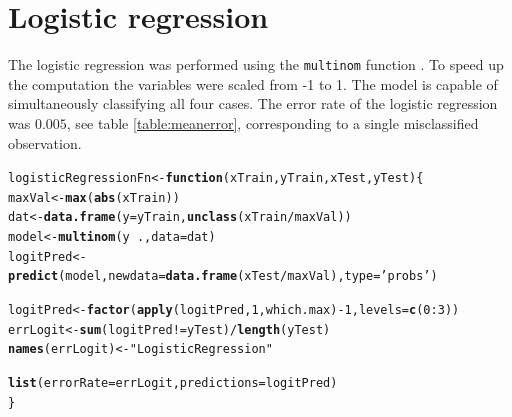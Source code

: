 \documentclass[a4paper,draft=false]{scrreprt}\usepackage[]{graphicx}\usepackage[]{color}
\makeatletter
\newcommand{\hlnum}[1]{\textcolor[rgb]{0.686,0.059,0.569}{#1}}%
\newcommand{\hlstr}[1]{\textcolor[rgb]{0.192,0.494,0.8}{#1}}%
\newcommand{\hlopt}[1]{\textcolor[rgb]{0,0,0}{#1}}%
\newcommand{\hlstd}[1]{\textcolor[rgb]{0.345,0.345,0.345}{#1}}%
\newcommand{\hlkwa}[1]{\textcolor[rgb]{0.161,0.373,0.58}{\textbf{#1}}}%
\newcommand{\hlkwb}[1]{\textcolor[rgb]{0.69,0.353,0.396}{#1}}%
\newcommand{\hlkwc}[1]{\textcolor[rgb]{0.333,0.667,0.333}{#1}}%
\newcommand{\hlkwd}[1]{\textcolor[rgb]{0.737,0.353,0.396}{\textbf{#1}}}%
\newenvironment{kframe}{%
 \def\at@end@of@kframe{}%
 \ifinner\ifhmode%
  \def\at@end@of@kframe{\end{minipage}}%
  \begin{minipage}{\columnwidth}%
 \fi\fi%
 \def\FrameCommand##1{\hskip\@totalleftmargin \hskip-\fboxsep
 \colorbox{shadecolor}{##1}\hskip-\fboxsep
     \hskip-\linewidth \hskip-\@totalleftmargin \hskip\columnwidth}%
 \MakeFramed {\advance\hsize-\width
   \@totalleftmargin\z@ \linewidth\hsize
   \@setminipage}}%
 {\par\unskip\endMakeFramed%
 \at@end@of@kframe}
\newenvironment{knitrout}{}{} %
\makeatother
\begin{document}
\section{Logistic regression} %
The logistic regression was performed using the \verb+multinom+ function \cite{nnet}. To speed up the computation the variables were scaled from -1 to 1. The model is capable of simultaneously classifying all four cases. The error rate of the logistic regression was $0.005$, see table \ref{table:meanerror}, corresponding to a single misclassified observation.
\begin{knitrout}
\color{fgcolor}\begin{kframe}
\begin{alltt}
\hlstd{logisticRegressionFn} \hlkwb{<-} \hlkwa{function}\hlstd{(}\hlkwc{xTrain}\hlstd{,} \hlkwc{yTrain}\hlstd{,} \hlkwc{xTest}\hlstd{,} \hlkwc{yTest}\hlstd{)\{}
    \hlstd{maxVal} \hlkwb{<-} \hlkwd{max}\hlstd{(}\hlkwd{abs}\hlstd{(xTrain))}
    \hlstd{dat} \hlkwb{<-} \hlkwd{data.frame}\hlstd{(}\hlkwc{y} \hlstd{= yTrain,} \hlkwd{unclass}\hlstd{(xTrain}\hlopt{/}\hlstd{maxVal))}
    \hlstd{model} \hlkwb{<-} \hlkwd{multinom}\hlstd{(y} \hlopt{~} \hlstd{.,} \hlkwc{data} \hlstd{= dat)}
    \hlstd{logitPred} \hlkwb{<-} \hlkwd{predict}\hlstd{(model,} \hlkwc{newdata}\hlstd{=} \hlkwd{data.frame}\hlstd{(xTest}\hlopt{/}\hlstd{maxVal),} \hlkwc{type}\hlstd{=}\hlstr{'probs'}\hlstd{)}

    \hlstd{logitPred} \hlkwb{<-} \hlkwd{factor}\hlstd{(}\hlkwd{apply}\hlstd{(logitPred,} \hlnum{1}\hlstd{, which.max)} \hlopt{-} \hlnum{1}\hlstd{,} \hlkwc{levels} \hlstd{=} \hlkwd{c}\hlstd{(}\hlnum{0}\hlopt{:}\hlnum{3}\hlstd{))}
    \hlstd{errLogit} \hlkwb{<-} \hlkwd{sum}\hlstd{(logitPred} \hlopt{!=} \hlstd{yTest)} \hlopt{/} \hlkwd{length}\hlstd{(yTest)}
    \hlkwd{names}\hlstd{(errLogit)} \hlkwb{<-} \hlstr{"LogisticRegression"}

    \hlkwd{list}\hlstd{(}\hlkwc{errorRate} \hlstd{= errLogit,} \hlkwc{predictions} \hlstd{= logitPred)}
\hlstd{\}}
\end{alltt}
\end{kframe}
\end{knitrout}
\end{document}
